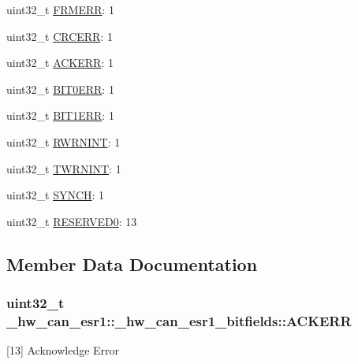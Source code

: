 \begin{DoxyCompactItemize}
uint32\+\_\+t \hyperlink{struct__hw__can__esr1_1_1__hw__can__esr1__bitfields_ade9fd8c60c04cef9b635a2fca970e92c}{F\+R\+M\+E\+RR}\+: 1
\item 
uint32\+\_\+t \hyperlink{struct__hw__can__esr1_1_1__hw__can__esr1__bitfields_abbb192c8e4563848471b13b5c8a13925}{C\+R\+C\+E\+RR}\+: 1
\item 
uint32\+\_\+t \hyperlink{struct__hw__can__esr1_1_1__hw__can__esr1__bitfields_a0979bc418b9b791209a329ab55947766}{A\+C\+K\+E\+RR}\+: 1
\item 
uint32\+\_\+t \hyperlink{struct__hw__can__esr1_1_1__hw__can__esr1__bitfields_a113045bbe4843cf4db39b8886c830b6a}{B\+I\+T0\+E\+RR}\+: 1
\item 
uint32\+\_\+t \hyperlink{struct__hw__can__esr1_1_1__hw__can__esr1__bitfields_a0238ff75694962b26bd20b209af13da4}{B\+I\+T1\+E\+RR}\+: 1
\item 
uint32\+\_\+t \hyperlink{struct__hw__can__esr1_1_1__hw__can__esr1__bitfields_a43b4c7add8a680ce04080fdd852bb4a8}{R\+W\+R\+N\+I\+NT}\+: 1
\item 
uint32\+\_\+t \hyperlink{struct__hw__can__esr1_1_1__hw__can__esr1__bitfields_af430dc8fc1a1426fe5068ffa1efe6e51}{T\+W\+R\+N\+I\+NT}\+: 1
\item 
uint32\+\_\+t \hyperlink{struct__hw__can__esr1_1_1__hw__can__esr1__bitfields_a4c3f7880aac48cae2ec19b2b11603b2c}{S\+Y\+N\+CH}\+: 1
\item 
uint32\+\_\+t \hyperlink{struct__hw__can__esr1_1_1__hw__can__esr1__bitfields_ad73cfab1f04284524bf6566ef1c9a46d}{R\+E\+S\+E\+R\+V\+E\+D0}\+: 13
\end{DoxyCompactItemize}


\subsection{Member Data Documentation}
\subsubsection[{\texorpdfstring{A\+C\+K\+E\+RR}{ACKERR}}]{\setlength{\rightskip}{0pt plus 5cm}uint32\+\_\+t \+\_\+hw\+\_\+can\+\_\+esr1\+::\+\_\+hw\+\_\+can\+\_\+esr1\+\_\+bitfields\+::\+A\+C\+K\+E\+RR}\hypertarget{struct__hw__can__esr1_1_1__hw__can__esr1__bitfields_a0979bc418b9b791209a329ab55947766}{}\label{struct__hw__can__esr1_1_1__hw__can__esr1__bitfields_a0979bc418b9b791209a329ab55947766}
\mbox{[}13\mbox{]} Acknowledge Error 
